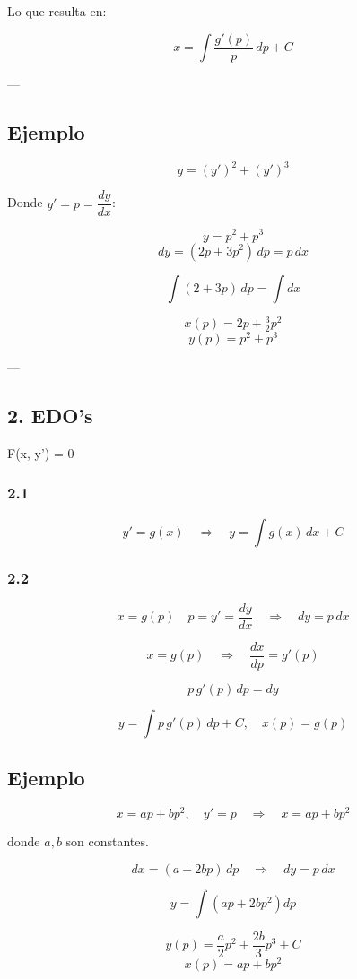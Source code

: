 \documentclass[a4paper,12pt]{article}
\begin{document}
Lo que resulta en:

\[
x = \int \frac{g'(p)}{p}\, dp + C
\]

---

\subsection*{Ejemplo}

\[
y = (y')^2 + (y')^3
\]

Donde \( y' = p = \dfrac{dy}{dx} \):

\[
y = p^2 + p^3
\]
\[
dy = (2p + 3p^2)\, dp = p\, dx
\]

\[
\int (2 + 3p)\, dp = \int dx
\]

\[
x(p) = 2p + \tfrac{3}{2} p^2
\]
\[
y(p) = p^2 + p^3
\]

---

\subsection*{2. EDO's } F(x, y') = 0

\subsubsection*{2.1}
\[
y' = g(x) \quad \Rightarrow \quad y = \int g(x)\, dx + C
\]

\subsubsection*{2.2}
\[
x = g(p) \quad p = y' = \frac{dy}{dx} \quad \Rightarrow \quad dy = p\, dx
\]

\[
x = g(p) \quad \Rightarrow \quad \frac{dx}{dp} = g'(p)
\]

\[
p\, g'(p)\, dp = dy
\]

\[
y = \int p\, g'(p)\, dp + C, \quad x(p) = g(p)
\]
\subsection*{Ejemplo}

\[
x = ap + b p^2, \quad y' = p \quad \Rightarrow \quad x = ap + bp^2
\]

donde \(a, b\) son constantes.

\[
dx = (a + 2bp)\, dp \quad \Rightarrow \quad dy = p\, dx
\]

\[
y = \int (ap + 2bp^2) dp
\]

\[
y(p) = \frac{a}{2} p^2 + \frac{2b}{3} p^3 + C
\]
\[
x(p) = ap + bp^2
\]
\end{document}
